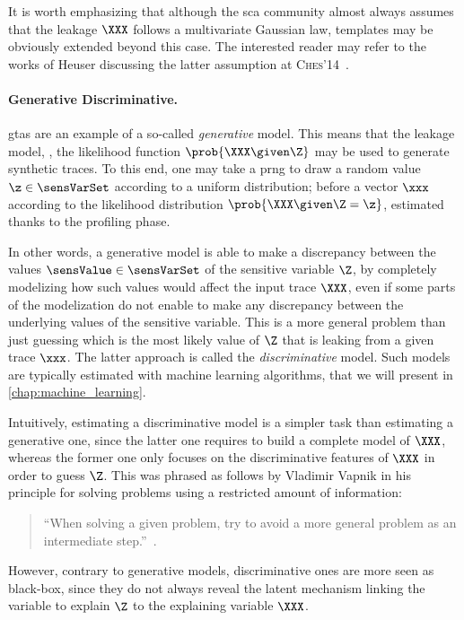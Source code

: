 It is worth emphasizing that although the \gls{sca} community almost always assumes that the leakage \(\XXX\) follows a multivariate Gaussian law, templates may be obviously extended beyond this case.
The interested reader may refer to the works of Heuser \etal{} discussing the latter assumption at \textsc{Ches}'14~\cite{heuser_good_2014}.


\paragraph{Generative \vs{} Discriminative.}
\label{sec:gen_vs_disc}
\glspl{gta} are an example of a so-called \emph{generative} model.
This means that the leakage model, \ie{}, the likelihood function \(\prob{\XXX \given \Z}\) may be used to generate synthetic traces.
To this end, one may take a \gls{prng} to draw a random value \(\z \in \sensVarSet\) according to a uniform distribution; before a vector \(\xxx\) according to the likelihood distribution \(\prob{\XXX \given \Z = \z}\), estimated thanks to the profiling phase.

In other words, a generative model is able to make a discrepancy between the values \(\sensValue \in \sensVarSet\) of the sensitive variable \(\Z\), by completely modelizing how such values would affect the input trace \(\XXX\), even if some parts of the modelization do not enable to make any discrepancy between the underlying values of the sensitive variable.
This is a more general problem than just guessing which is the most likely value of \(\Z\) that is leaking from a given trace \(\xxx\).
The latter approach is called the \emph{discriminative} model.
Such models are typically estimated with machine learning algorithms, that we will present in \autoref{chap:machine_learning}.

Intuitively, estimating a discriminative model is a simpler task than estimating a generative one, since the latter one requires to build a complete model of \(\XXX\), whereas the former one only focuses on the discriminative features of \(\XXX\) in order to guess \(\Z\).
This was phrased as follows by Vladimir Vapnik in his principle for solving problems using a restricted amount of information: 
\begin{quote}
    ``When solving a given problem, try to avoid a more general problem as an intermediate step.''~\cite[Chap.~1.9]{vapnik_nature_2000}.
\end{quote}
However, contrary to generative models, discriminative ones are more seen as black-box, since they do not always reveal the latent mechanism linking the variable to explain \(\Z\) to the explaining variable \(\XXX\).

